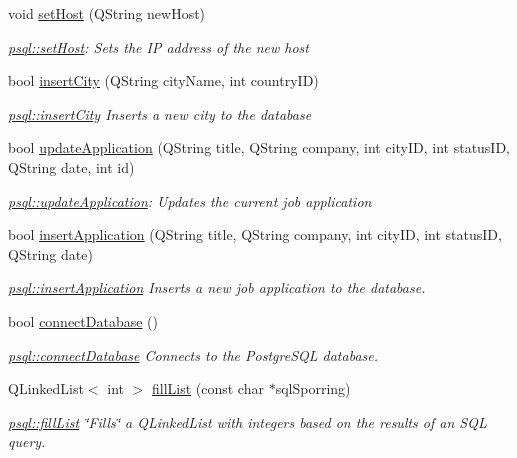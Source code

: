 \begin{DoxyCompactItemize}
void \hyperlink{classpsql_a96b3b9483f1a642c026d4b5cf505eb75}{set\+Host} (Q\+String new\+Host)
\begin{DoxyCompactList}\small\item\em \hyperlink{classpsql_a96b3b9483f1a642c026d4b5cf505eb75}{psql\+::set\+Host}\+: Sets the IP address of the new host \end{DoxyCompactList}\item 
bool \hyperlink{classpsql_a767b85014d9df3eac148730f18888d6d}{insert\+City} (Q\+String city\+Name, int country\+ID)
\begin{DoxyCompactList}\small\item\em \hyperlink{classpsql_a767b85014d9df3eac148730f18888d6d}{psql\+::insert\+City} Inserts a new city to the database \end{DoxyCompactList}\item 
bool \hyperlink{classpsql_a9a9c4c858ae22eac8a9a4572b16500f5}{update\+Application} (Q\+String title, Q\+String company, int city\+ID, int status\+ID, Q\+String date, int id)
\begin{DoxyCompactList}\small\item\em \hyperlink{classpsql_a9a9c4c858ae22eac8a9a4572b16500f5}{psql\+::update\+Application}\+: Updates the current job application \end{DoxyCompactList}\item 
bool \hyperlink{classpsql_a4073d4f70f2ae6211ba0328c2008407c}{insert\+Application} (Q\+String title, Q\+String company, int city\+ID, int status\+ID, Q\+String date)
\begin{DoxyCompactList}\small\item\em \hyperlink{classpsql_a4073d4f70f2ae6211ba0328c2008407c}{psql\+::insert\+Application} Inserts a new job application to the database. \end{DoxyCompactList}\item 
bool \hyperlink{classpsql_ada485c933df77453629e3821ab19fa4c}{connect\+Database} ()
\begin{DoxyCompactList}\small\item\em \hyperlink{classpsql_ada485c933df77453629e3821ab19fa4c}{psql\+::connect\+Database} Connects to the Postgre\+S\+QL database. \end{DoxyCompactList}\item 
Q\+Linked\+List$<$ int $>$ \hyperlink{classpsql_ad5ac3722cffd31587435b1bee640a5e2}{fill\+List} (const char $\ast$sql\+Sporring)
\begin{DoxyCompactList}\small\item\em \hyperlink{classpsql_ad5ac3722cffd31587435b1bee640a5e2}{psql\+::fill\+List} \char`\"{}\+Fills\char`\"{} a Q\+Linked\+List with integers based on the results of an S\+QL query. \end{DoxyCompactList}\item 

\end{DoxyCompactItemize}
